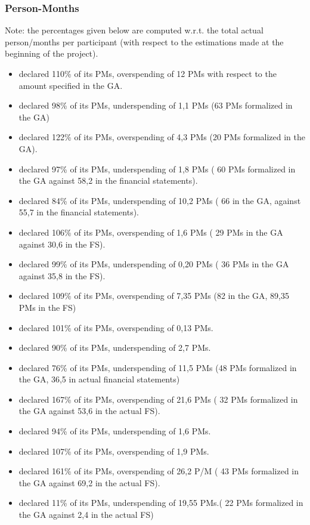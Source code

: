 \subsubsection{Person-Months}

Note: the percentages given below are computed w.r.t. the total actual
person/months per participant  (with respect to the estimations made 
at the beginning of the project).


\begin{itemize}
\item {} declared 110\% of its PMs, overspending of 12 PMs
with respect to the amount specified in the GA.
\item {} declared 98\% of its PMs, underspending of 1,1 PMs (63 PMs
  formalized in the GA) 
\item {} declared 122\% of its PMs, overspending of 4,3 PMs (20 PMs
  formalized in the GA).
\item {} declared 97\% of its PMs, underspending of 1,8 PMs ( 60 PMs 
formalized in the GA against 58,2 in the financial statements).
\item {} declared 84\% of its PMs, underspending of 10,2 PMs ( 66 in the
 GA, against 55,7 in the financial statements).
\item {} declared 106\% of its PMs, overspending of 1,6 PMs ( 29 PMs 
in the GA against 30,6 in the FS).
\item {} declared 99\% of its PMs, underspending of 0,20 PMs ( 36 PMs 
in the GA against 35,8 in the FS).
\item {} declared 109\% of its PMs, overspending of 7,35 PMs (82 in the GA,
 89,35 PMs in the FS)
\item {} declared 101\% of its PMs, overspending of 0,13 PMs.
\item {} declared 90\% of its PMs, underspending of 2,7 PMs.
\item {} declared 76\% of its PMs, underspending of 11,5 PMs (48 PMs
formalized in the GA, 36,5 in actual financial statements)
\item {} declared 167\% of its PMs, overspending of 21,6 PMs ( 32 PMs
formalized in the GA against 53,6 in the actual FS).
\item {} declared 94\% of its PMs, underspending of 1,6 PMs.
\item {} declared 107\% of its PMs, overspending of 1,9 PMs.
\item {} declared 161\% of its PMs, overspending of 26,2 P/M ( 43 PMs
formalized in the GA against 69,2 in the actual FS).
\item {} declared 11\% of its PMs, underspending of 19,55 PMs.( 22 PMs
formalized in the GA against 2,4 in the actual FS)

\end{itemize}

